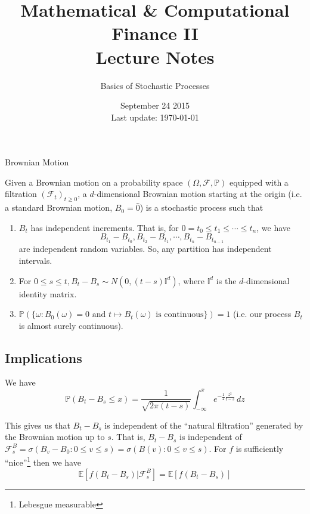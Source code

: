 \documentclass[12pt]{article}
\newlength\tindent
\renewcommand{\indent}{\hspace*{\tindent}}
\begin{document}
 
 
\title{Mathematical \& Computational Finance II\\Lecture Notes}
\author{Basics of Stochastic Processes}
\date{September 24 2015 \\ Last update: \today{}}
\maketitle

\begin{section}{Brownian Motion}

\indent Given a Brownian motion on a probability space $(\Omega, \mathcal F, \mathbb P)$ equipped with a filtration $(\mathcal F_t)_{t\geq0}$, a $d$-dimensional Brownian motion starting at the origin (i.e. a standard Brownian motion, $B_0 = \hat{0}$) is a stochastic process such that

\begin{enumerate}
	\item $B_t$ has independent increments. That is, for $0 = t_0 \leq t_1 \leq \cdots \leq t_n$, we have
		\begin{equation*}
			B_{t_1} - B_{t_0}, B_{t_2} - B_{t_1}, \cdots, B_{t_n} - B_{t_{n-1}}
		\end{equation*}
		are independent random variables. So, any partition has independent intervals.
	\item For $0 \leq s \leq t, B_t - B_s \sim N(0, (t - s)\mathbb I^d)$, where $\mathbb I^d$ is the $d$-dimensional identity matrix.
	\item $\mathbb P(\{\omega : B_0(\omega) = 0 \text{ and } t \mapsto B_t(\omega) \text{ is continuous}\}) = 1$ (i.e. our process $B_t$ is almost surely continuous).
\end{enumerate}

\subsection{Implications}

We have
\begin{equation*}
	\mathbb P(B_t - B_s \leq x) = \frac{1}{\sqrt{2\pi(t-s)}}\int^x_{-\infty} e^{-\frac{1}{2}\frac{z^2}{t-s}}\,dz
\end{equation*}

\indent This gives us that $B_t - B_s$ is independent of the ``natural filtration'' generated by the Brownian motion up to $s$. That is, $B_t - B_s$ is independent of $\mathcal F^B_s = \sigma(B_v - B_0: 0 \leq v \leq s) = \sigma(B(v): 0 \leq v \leq s)$. For $f$ is sufficiently ``nice''\footnote{Lebesgue measurable} then we have
\begin{equation*}
	\mathbb E[f(B_t - B_s)|\mathcal F^B_s] = \mathbb E[f(B_t - B_s)]
\end{equation*}


\end{section}
\end{document}
